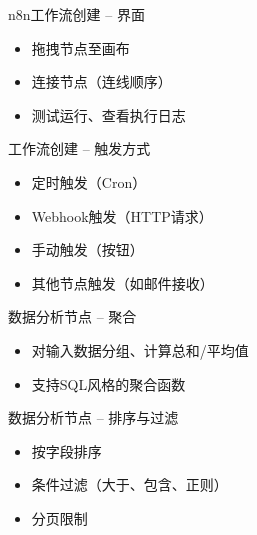 \begin{frame}{n8n工作流创建 – 界面}
\begin{center}
\end{center}
\begin{itemize}
\item 拖拽节点至画布
\item 连接节点（连线顺序）
\item 测试运行、查看执行日志
\end{itemize}
\end{frame}
\begin{frame}{工作流创建 – 触发方式}
\begin{itemize}
\item 定时触发（Cron）
\item Webhook触发（HTTP请求）
\item 手动触发（按钮）
\item 其他节点触发（如邮件接收）
\end{itemize}
\end{frame}

\begin{frame}{数据分析节点 – 聚合}
\begin{itemize}
\item 对输入数据分组、计算总和/平均值
\item 支持SQL风格的聚合函数
\end{itemize}
\end{frame}
\begin{frame}{数据分析节点 – 排序与过滤}
\begin{itemize}
\item 按字段排序
\item 条件过滤（大于、包含、正则）
\item 分页限制
\end{itemize}
\end{frame}

